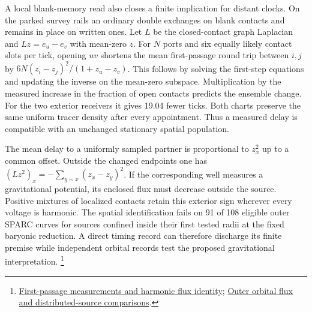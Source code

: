 \documentclass[11pt]{article}
\begin{document}
A local blank-memory read also closes a finite implication for distant
clocks. On the parked survey rails an ordinary double exchanges on
blank contacts and remains in place on written ones. Let \(L\) be the
closed-contact graph Laplacian and \(Lz=e_u-e_v\) with mean-zero \(z\).
For \(N\) ports and six equally likely contact slots per tick, opening
\(uv\) shortens the mean first-passage round trip between \(i,j\) by
\(6N(z_i-z_j)^2/(1+z_u-z_v)\). This follows by solving the first-step
equations and updating the inverse on the mean-zero subspace.
Multiplication by the measured increase in the fraction of open contacts
predicts the ensemble change. For the two exterior receivers it gives
19.04 fewer ticks. Both charts preserve the same uniform tracer density
after every appointment. Thus a measured delay is compatible with an
unchanged stationary spatial population.

The mean delay to a uniformly sampled partner is proportional to
\(z_x^2\) up to a common offset. Outside the changed endpoints one has
\((Lz^2)_x=-\sum_{y\sim x}(z_x-z_y)^2\). If the corresponding well
measures a gravitational potential, its enclosed flux must decrease
outside the source. Positive mixtures of localized contacts retain
this exterior sign wherever every voltage is harmonic. The spatial
identification fails on 91 of 108 eligible outer SPARC curves for
sources confined inside their first tested radii at the fixed baryonic
reduction. A direct timing record can therefore discharge its finite
premise while independent orbital records test the proposed gravitational
interpretation.%
\footnote{\href{https://github.com/FloatingPragma/observer-patch-holography/blob/main/model/experiments/interval_echo_shell_flux/product_address/green_response/material_recoil/overlap_source/native_boundary/stock/aperture/CLOSED_SOURCE_RESULTS.md}{First-passage measurements and harmonic flux identity};
\href{https://github.com/FloatingPragma/observer-patch-holography/blob/main/code/cosmology/paid_trail_bao/PASSAGE_MASS.md}{Outer orbital flux and distributed-source comparisons}.}
\end{document}
